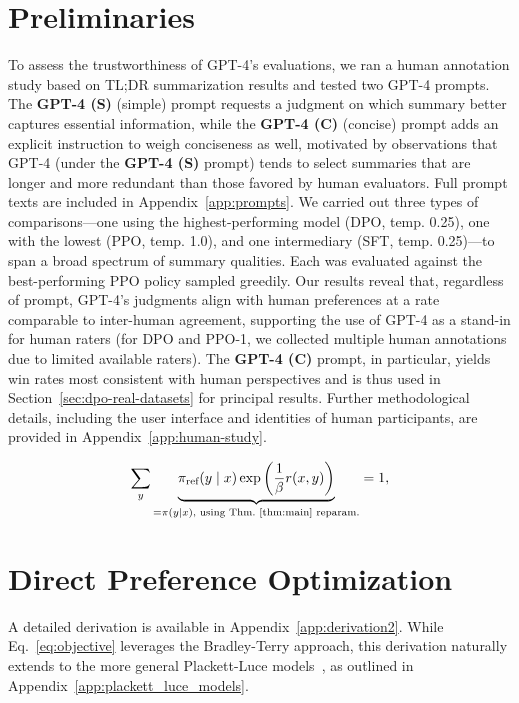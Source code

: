 \section{Preliminaries}\label{section:prelims}

To assess the trustworthiness of GPT-4’s evaluations, we ran a human annotation study based on TL;DR summarization results and tested two GPT-4 prompts. The \textbf{GPT-4 (S)} (simple) prompt requests a judgment on which summary better captures essential information, while the \textbf{GPT-4 (C)} (concise) prompt adds an explicit instruction to weigh conciseness as well, motivated by observations that GPT-4 (under the \textbf{GPT-4 (S)} prompt) tends to select summaries that are longer and more redundant than those favored by human evaluators. Full prompt texts are included in Appendix~\ref{app:prompts}. We carried out three types of comparisons—one using the highest-performing model (DPO, temp. 0.25), one with the lowest (PPO, temp. 1.0), and one intermediary (SFT, temp. 0.25)—to span a broad spectrum of summary qualities. Each was evaluated against the best-performing PPO policy sampled greedily. Our results reveal that, regardless of prompt, GPT-4’s judgments align with human preferences at a rate comparable to inter-human agreement, supporting the use of GPT-4 as a stand-in for human raters (for DPO and PPO-1, we collected multiple human annotations due to limited available raters). The \textbf{GPT-4 (C)} prompt, in particular, yields win rates most consistent with human perspectives and is thus used in Section~\ref{sec:dpo-real-datasets} for principal results. Further methodological details, including the user interface and identities of human participants, are provided in Appendix~\ref{app:human-study}.

\begin{equation}\label{eq:lag_p}
     \sum_{y}\underbrace{\pi_\text{ref}(y\mid x)\exp\left(\frac{1}{\beta}r(x, y)\right)}_{=\pi(y\mid x)\text{, using Thm.~\ref{thm:main} reparam.}} = 1,
\end{equation}

\section{Direct Preference Optimization}\label{sec:DPO}

A detailed derivation is available in Appendix~\ref{app:derivation2}. While Eq.~\ref{eq:objective} leverages the Bradley-Terry approach, this derivation naturally extends to the more general Plackett-Luce models~\citep{plackett1975analysis, luce2012individual}, as outlined in Appendix~\ref{app:plackett_luce_models}.

